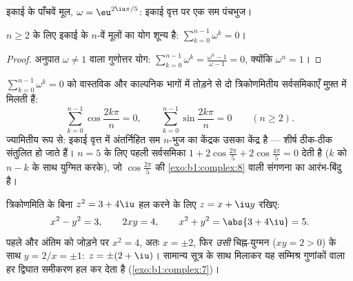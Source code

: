 \begin{omfigure}

{\small इकाई के पाँचवें मूल, $\omega = \eu^{2\iu\pi/5}$: इकाई वृत्त पर एक सम
पंचभुज।}
\end{omfigure}

\begin{proposition}[इकाई के मूलों का योग]\label{prop:b1:complex:sumroots}
$n \geq 2$ के लिए इकाई के $n$-वें मूलों का योग शून्य है: $\sum_{k=0}^{n-1}
\omega^k = 0$।
\end{proposition}

\begin{proof}
अनुपात $\omega \neq 1$ वाला गुणोत्तर योग: $\sum_{k=0}^{n-1} \omega^k =
\frac{\omega^n - 1}{\omega - 1} = 0$, क्योंकि $\omega^n = 1$।
\end{proof}

\begin{example}[वास्तविक और काल्पनिक भाग पढ़ना]\label{ex:b1:complex:sumrootsparts}
$\sum_{k=0}^{n-1}\omega^k = 0$ को वास्तविक और काल्पनिक भागों में तोड़ने से
दो त्रिकोणमितीय सर्वसमिकाएँ मुफ़्त में मिलती हैं:
\[
\sum_{k=0}^{n-1}\cos\frac{2k\pi}n = 0,
\qquad
\sum_{k=0}^{n-1}\sin\frac{2k\pi}n = 0
\qquad (n \geq 2).
\]
ज्यामितीय रूप से: इकाई वृत्त में अंतर्निहित सम $n$-भुज का केंद्रक उसका
केंद्र है --- शीर्ष ठीक-ठीक संतुलित हो जाते हैं। $n = 5$ के लिए पहली
सर्वसमिका $1 + 2\cos\frac{2\pi}5 + 2\cos\frac{4\pi}5 = 0$ देती है ($k$ को $n
- k$ के साथ युग्मित करके), जो $\cos\frac{2\pi}5$ की \cref{exo:b1:complex:8}
वाली संगणना का आरंभ-बिंदु है।
\end{example}

\begin{example}[बीजीय रूप में वर्गमूल]\label{ex:b1:complex:sqrt}
त्रिकोणमिति के बिना $z^2 = 3 + 4\iu$ हल करने के लिए $z = x + \iu y$ रखिए:
\[
x^2 - y^2 = 3, \qquad 2xy = 4, \qquad x^2 + y^2 = \abs{3 + 4\iu} = 5 .
\]
पहले और अंतिम को जोड़ने पर $x^2 = 4$, अतः $x = \pm 2$, फिर \emph{उसी}
चिह्न-युग्मन ($xy = 2 > 0$) के साथ $y = 2/x = \pm 1$: $z = \pm(2 + \iu)$।
सामान्य सूत्र के साथ मिलाकर यह सम्मिश्र गुणांकों वाला हर द्विघात समीकरण हल
कर देता है (\cref{exo:b1:complex:7})।
\end{example}

